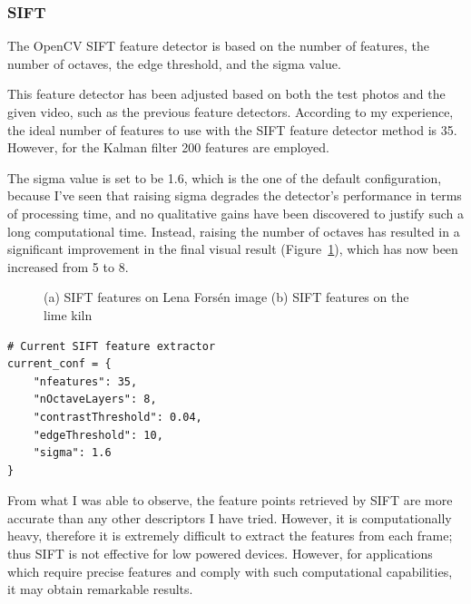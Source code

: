 \documentclass[journal]{IEEEtran}
\begin{document}
\subsubsection{SIFT}

The OpenCV SIFT feature detector is based on the number of features, the number of octaves, the edge threshold, and the sigma value. 

This feature detector has been adjusted based on both the test photos and the given video, such as the previous feature detectors. According to my experience, the ideal number of features to use with the SIFT feature detector method is 35. However, for the Kalman filter 200 features are employed.

The sigma value is set to be 1.6, which is the one of the default configuration, because I've seen that raising sigma degrades the detector's performance in terms of processing time, and no qualitative gains have been discovered to justify such a long computational time.
Instead, raising the number of octaves has resulted in a significant improvement in the final visual result (Figure~\ref{fig:sift}), which has now been increased from 5 to 8. 

\begin{figure}
\centering
    \caption{(a) SIFT features on Lena Forsén image (b) SIFT features on the lime kiln}
    \label{fig:sift}
\end{figure}

\begin{verbatim}
# Current SIFT feature extractor
current_conf = {
    "nfeatures": 35,
    "nOctaveLayers": 8,
    "contrastThreshold": 0.04,
    "edgeThreshold": 10,
    "sigma": 1.6
}
\end{verbatim}

From what I was able to observe, the feature points retrieved by SIFT are more accurate than any other descriptors I have tried. However, it is computationally heavy, therefore it is extremely difficult to extract the features from each frame; thus SIFT is not effective for low powered devices. However, for applications which require precise features and comply with such computational capabilities, it may obtain remarkable results.
\end{document}
